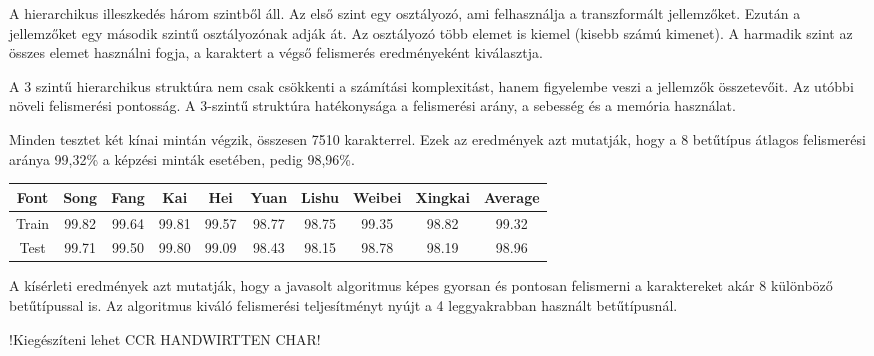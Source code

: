 A hierarchikus illeszkedés három szintből áll. Az első szint egy osztályozó, ami felhasználja a transzformált jellemzőket. Ezután a jellemzőket egy második szintű osztályozónak adják át. Az osztályozó több elemet is kiemel (kisebb számú kimenet). A harmadik szint az összes elemet használni fogja, a karaktert a végső felismerés eredményeként kiválasztja.

A 3 szintű hierarchikus struktúra nem csak csökkenti a számítási komplexitást, hanem figyelembe veszi a jellemzők összetevőit. Az utóbbi növeli felismerési pontosság. A 3-szintű struktúra hatékonysága a felismerési arány, a sebesség és a memória használat.

Minden tesztet két kínai mintán végzik, összesen 7510 karakterrel. Ezek az eredmények azt mutatják, hogy a 8 betűtípus átlagos felismerési aránya 99,32\% a képzési minták esetében, pedig 98,96\%.

\begin{center}
\begin{tabular}{ |c|c|c|c|c|c|c|c|c|c|}
\hline
Font & Song & Fang & Kai & Hei & Yuan & Lishu & Weibei & Xingkai & Average\\
\hline
Train & 99.82 & 99.64 & 99.81 & 99.57 & 98.77 & 98.75 & 99.35 & 98.82 & 99.32\\
\hline
Test & 99.71 & 99.50 & 99.80 & 99.09 & 98.43 & 98.15 & 98.78 & 98.19 & 98.96\\
\hline
\end{tabular}
\end{center}

A kísérleti eredmények azt mutatják, hogy a javasolt algoritmus képes gyorsan és pontosan felismerni a karaktereket akár 8 különböző betűtípussal is. Az algoritmus kiváló felismerési teljesítményt nyújt a 4 leggyakrabban használt betűtípusnál.

!Kiegészíteni lehet CCR HANDWIRTTEN CHAR!
